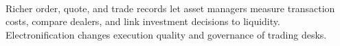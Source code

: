 \begin{practitionernote} \\
Richer order, quote, and trade records let asset managers measure transaction costs, compare dealers, and link investment decisions to liquidity. Electronification changes execution quality and governance of trading desks.
\end{practitionernote}
